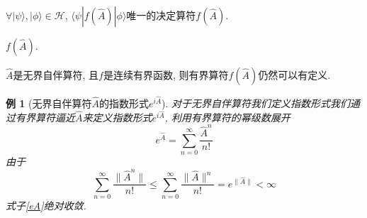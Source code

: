 \documentclass[a4paper,11pt]{book}
\newtheorem{example}{例}[section]
\begin{document}
$\forall|\psi\rangle,|\phi\rangle\in\mathcal{H}$, $\langle\psi|f(\hat{A})|\phi\rangle$唯一的决定算符$f(\hat{A})$.

$f(\hat{A})$.

$\hat{A}$是无界自伴算符, 且$f$是连续有界函数, 则有界算符$f(\hat{A})$仍然可以有定义.
\begin{example}[无界自伴算符$\hat{A}$的指数形式$e^{i\hat{A}}$]
  对于无界自伴算符我们定义指数形式我们通过有界算符逼近$\hat{A}$来定义指数形式$e^{i\hat{A}}$, 利用有界算符的幂级数展开
  \begin{equation}\label{eA}
    e^{\hat{A}}=\sum_{n=0}^{\infty}\frac{\hat{A}^n}{n!}
  \end{equation}
  由于
  \begin{equation*}
    \sum_{n=0}^{\infty}\frac{\|\hat{A}^n\|}{n!}\leq\sum_{n=0}^{\infty}\frac{\|\hat{A}\|^n}{n!}=e^{\|\hat{A}\|}<\infty
  \end{equation*}
  式子\eqref{eA}绝对收敛.


\end{example}
\end{document}
